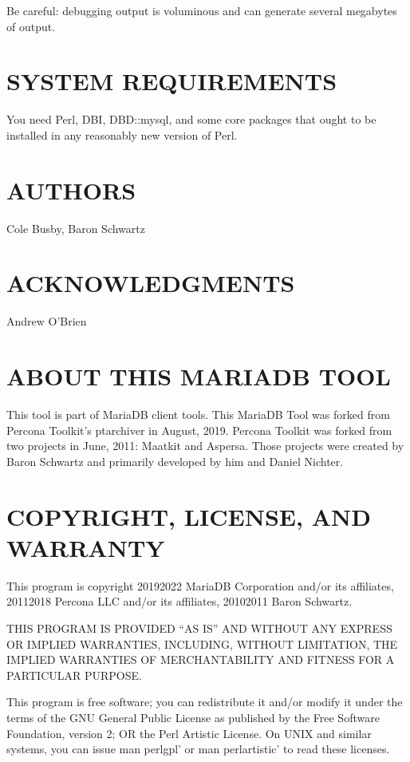 \documentclass[letterpaper,10pt,english]{sphinxmanual}
\begin{document}
Be careful: debugging output is voluminous and can generate several megabytes
of output.


\section{SYSTEM REQUIREMENTS}
\label{\detokenize{mariadb-archiver:system-requirements}}
You need Perl, DBI, DBD::mysql, and some core packages that ought to be
installed in any reasonably new version of Perl.


\section{AUTHORS}
\label{\detokenize{mariadb-archiver:authors}}
Cole Busby, Baron Schwartz


\section{ACKNOWLEDGMENTS}
\label{\detokenize{mariadb-archiver:acknowledgments}}
Andrew O’Brien


\section{ABOUT THIS MARIADB TOOL}
\label{\detokenize{mariadb-archiver:about-this-mariadb-tool}}
This tool is part of MariaDB client tools. This MariaDB Tool was forked from
Percona Toolkit’s pt\sphinxhyphen{}archiver in August, 2019. Percona Toolkit was forked from two
projects in June, 2011: Maatkit and Aspersa.  Those projects were created by
Baron Schwartz and primarily developed by him and Daniel Nichter.


\section{COPYRIGHT, LICENSE, AND WARRANTY}
\label{\detokenize{mariadb-archiver:copyright-license-and-warranty}}
This program is copyright 2019\sphinxhyphen{}2022 MariaDB Corporation and/or its affiliates,
2011\sphinxhyphen{}2018 Percona LLC and/or its affiliates, 2010\sphinxhyphen{}2011 Baron Schwartz.

THIS PROGRAM IS PROVIDED “AS IS” AND WITHOUT ANY EXPRESS OR IMPLIED
WARRANTIES, INCLUDING, WITHOUT LIMITATION, THE IMPLIED WARRANTIES OF
MERCHANTABILITY AND FITNESS FOR A PARTICULAR PURPOSE.

This program is free software; you can redistribute it and/or modify it under
the terms of the GNU General Public License as published by the Free Software
Foundation, version 2; OR the Perl Artistic License.  On UNIX and similar
systems, you can issue \textasciigrave{}man perlgpl’ or \textasciigrave{}man perlartistic’ to read these
licenses.
\end{document}
